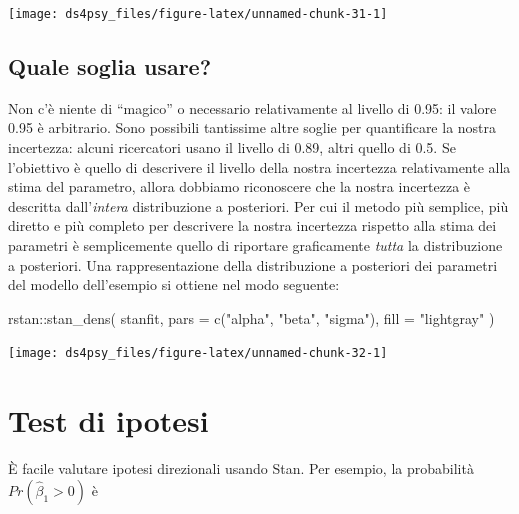 \documentclass[
  11pt,
]{krantz}
\makeatletter
\newenvironment{Shaded}{\begin{snugshade}}{\end{snugshade}}
\newcommand{\AttributeTok}[1]{\textcolor[rgb]{0.61,0.61,0.61}{#1}}
\newcommand{\CommentTok}[1]{\textcolor[rgb]{0.37,0.37,0.37}{\textit{#1}}}
\newcommand{\DecValTok}[1]{\textcolor[rgb]{0.06,0.06,0.06}{#1}}
\newcommand{\FunctionTok}[1]{\textcolor[rgb]{0,0,0}{#1}}
\newcommand{\NormalTok}[1]{#1}
\newcommand{\SpecialCharTok}[1]{\textcolor[rgb]{0,0,0}{#1}}
\newcommand{\StringTok}[1]{\textcolor[rgb]{0.5,0.5,0.5}{#1}}
\newenvironment{kframe}{%
\medskip{}
\setlength{\fboxsep}{.8em}
 \def\at@end@of@kframe{}%
 \ifinner\ifhmode%
  \def\at@end@of@kframe{\end{minipage}}%
  \begin{minipage}{\columnwidth}%
 \fi\fi%
 \def\FrameCommand##1{\hskip\@totalleftmargin \hskip-\fboxsep
 \colorbox{shadecolor}{##1}\hskip-\fboxsep
     \hskip-\linewidth \hskip-\@totalleftmargin \hskip\columnwidth}%
 \MakeFramed {\advance\hsize-\width
   \@totalleftmargin\z@ \linewidth\hsize
   \@setminipage}}%
 {\par\unskip\endMakeFramed%
 \at@end@of@kframe}
\renewenvironment{Shaded}{\begin{kframe}}{\end{kframe}}
\theoremstyle{definition}
\theoremstyle{definition}
\theoremstyle{definition}
\theoremstyle{definition}
\theoremstyle{remark}
\makeatother
\begin{document}
\begin{center}\texttt{[image: ds4psy\_files/figure-latex/unnamed-chunk-31-1]} \end{center}

\hypertarget{quale-soglia-usare}{%
\subsection{Quale soglia usare?}\label{quale-soglia-usare}}

Non c'è niente di ``magico'' o necessario relativamente al livello di 0.95: il valore 0.95 è arbitrario. Sono possibili tantissime altre soglie per quantificare la nostra incertezza: alcuni ricercatori usano il livello di 0.89, altri quello di 0.5. Se l'obiettivo è quello di descrivere il livello della nostra incertezza relativamente alla stima del parametro, allora dobbiamo riconoscere che la nostra incertezza è descritta dall'\emph{intera} distribuzione a posteriori. Per cui il metodo più semplice, più diretto e più completo per descrivere la nostra incertezza rispetto alla stima dei parametri è semplicemente quello di riportare graficamente \emph{tutta} la distribuzione a posteriori. Una rappresentazione della distribuzione a posteriori dei parametri del modello dell'esempio si ottiene nel modo seguente:

\begin{Shaded}
\begin{Highlighting}[]
\NormalTok{rstan}\SpecialCharTok{::}\FunctionTok{stan\_dens}\NormalTok{(}
\NormalTok{  stanfit,}
  \AttributeTok{pars =} \FunctionTok{c}\NormalTok{(}\StringTok{"alpha"}\NormalTok{, }\StringTok{"beta"}\NormalTok{, }\StringTok{"sigma"}\NormalTok{),}
  \AttributeTok{fill =} \StringTok{"lightgray"}
\NormalTok{)}
\end{Highlighting}
\end{Shaded}

\begin{center}\texttt{[image: ds4psy\_files/figure-latex/unnamed-chunk-32-1]} \end{center}

\hypertarget{test-di-ipotesi}{%
\section{Test di ipotesi}\label{test-di-ipotesi}}

È facile valutare ipotesi direzionali usando Stan. Per esempio, la probabilità \(Pr(\hat{\beta}_1 > 0)\) è

\begin{Shaded}
\end{Shaded}
\end{document}

